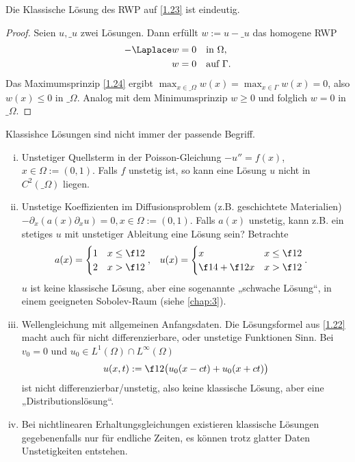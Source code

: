 \begin{kor} \label{1.25}
	Die Klassische Lösung des RWP auf \ref{1.23} ist eindeutig.
	\begin{proof}
		Seien $u, \_u$ zwei Lösungen.
		Dann erfüllt $w := u - \_u$ das homogene RWP
		\begin{align*}
			-\Laplace w &= 0 & & \text{in $\Omega$}, \\
			w &= 0 && \text{auf $\Gamma$}.
		\end{align*}
		Das Maximumsprinzip \ref{1.24} ergibt $\max_{x\in\_\Omega} w(x) = \max_{x\in\Gamma} w(x) = 0$, also $w(x) \le 0$ in $\_\Omega$.
		Analog mit dem Minimumsprinzip $w \ge 0$ und folglich $w = 0$ in $\_\Omega$.
	\end{proof}
\end{kor}

\begin{nt*}
	Klassishce Lösungen sind nicht immer der passende Begriff.
	\begin{enumerate}[i)]
		\item
			Unstetiger Quellsterm in der Poisson-Gleichung $-u'' = f(x)$, $x \in \Omega := (0,1)$.
			Falls $f$ unstetig ist, so kann eine Lösung $u$ nicht in $C^2(\_\Omega)$ liegen.
		\item
			Unstetige Koeffizienten im Diffusionsproblem (z.B. geschichtete Materialien) $-\partial_x(a(x) \partial_x u) = 0, x \in \Omega := (0,1)$.
			Falls $a(x)$ unstetig, kann z.B. ein stetiges $u$ mit unstetiger Ableitung eine Lösung sein?
			Betrachte
			\begin{align*}
				a (x) &= \begin{cases}
					1 & x \le \f 12 \\
					2 & x > \f 12
				\end{cases},&
				u(x) &= \begin{cases}
					x & x \le \f 12 \\
					\f 14 + \f 12 x & x > \f 12
				\end{cases}.
			\end{align*}
			$u$ ist keine klassische Lösung, aber eine sogenannte „schwache Lösung“, in einem geeigneten Sobolev-Raum (siehe \ref{chap:3}).
		\item
			Wellengleichung mit allgemeinen Anfangsdaten.
			Die Lösungsformel aus \ref{1.22} macht auch für nicht differenzierbare, oder unstetige Funktionen Sinn.
			Bei $v_0 = 0$ und $u_0 \in L^1(\Omega) \cap L^\infty(\Omega)$
			\[
				u(x,t) := \f 12 \big( u_0(x-ct) + u_0(x+ct)\big)
			\]
			ist nicht differenzierbar/unstetig, also keine klassische Lösung, aber eine „Distributionslösung“.
		\item
			Bei nichtlinearen Erhaltungsgleichungen existieren klassische Lösungen gegebenenfalls nur für endliche Zeiten, es können trotz glatter Daten Unstetigkeiten entstehen.
	\end{enumerate}
\end{nt*}


